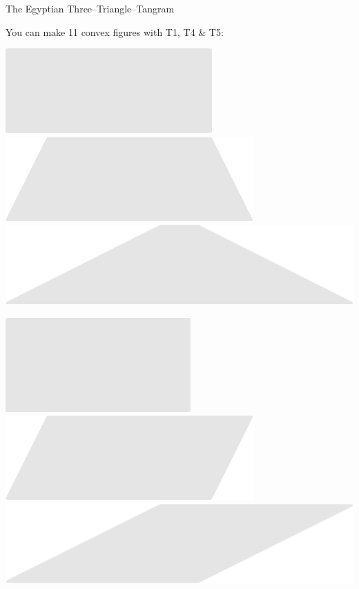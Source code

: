 \documentclass[14pt]{beamer}
\begin{document}
    \begin{frame}{The Egyptian Three--Triangle--Tangram}
        \begin{center}
            You can make 11 convex figures with T1, T4 \& T5:

            \bigskip \bigskip

            \includegraphics[scale=0.39]{figures/figure004b.pdf}\qquad
            \includegraphics[scale=0.39]{figures/figure004e.pdf}\qquad
            \includegraphics[scale=0.39]{figures/figure004f.pdf}\\

            \bigskip\medskip

            \;\;\includegraphics[scale=0.39]{figures/figure004a.pdf}\qquad
            \includegraphics[scale=0.39]{figures/figure004h.pdf}\qquad
            \includegraphics[scale=0.39]{figures/figure004i.pdf}\\


\end{center}
\end{frame}
\end{document}
